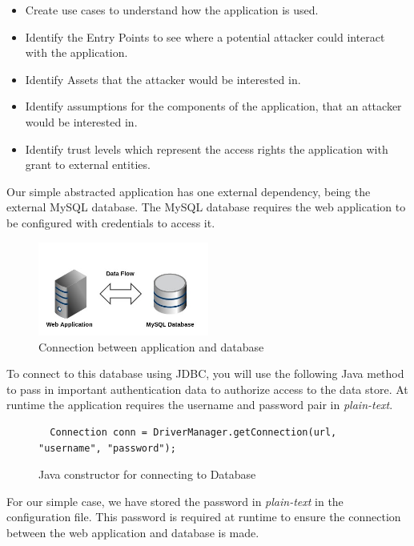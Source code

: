 \documentclass[11pt, a4paper, twoside, notitlepage]{article}
\begin{document}
\begin{itemize}
  \item Create use cases to understand how the application is used.
  \item Identify the Entry Points to see where a potential attacker could interact with the application.
  \item Identify Assets that the attacker would be interested in.
  \item Identify assumptions for the components of the application, that an attacker would be interested in.
  \item Identify trust levels which represent the access rights the application with grant to external entities. 
\end{itemize}

Our simple abstracted application has one external dependency, being the external MySQL database.  The MySQL database requires the web application to be configured with credentials to access it. 

\begin{figure}[h!]
    \centering
    \includegraphics[width=0.5\textwidth]{external-overview.jpg}
    \caption{Connection between application and database}
\end{figure}

To connect to this database using JDBC, you will use the following Java method to pass in important authentication data to authorize access to the data store. At runtime the application requires the username and password pair in \emph{plain-text}. \\


\begin{figure}[h!]
\begin{lstlisting}
  Connection conn = DriverManager.getConnection(url, "username", "password");
\end{lstlisting} 
\caption{Java constructor for connecting to Database}
\end{figure}

For our simple case, we have stored the password in \emph{plain-text} in the configuration file. This password is required at runtime to ensure the connection between the web application and database is made. \\
\end{document}
